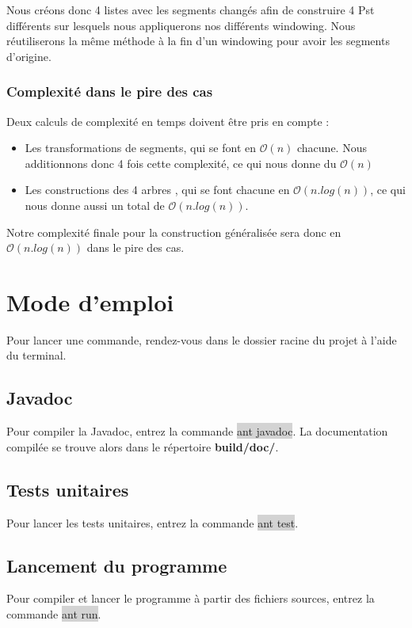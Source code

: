 \documentclass[10pt,a4paper]{article}
\begin{document}
Nous créons donc 4 listes avec les segments changés afin de construire 4 Pst différents sur lesquels nous appliquerons nos différents windowing. Nous réutiliserons la même méthode à la fin d'un windowing pour avoir les segments d'origine.

\subsubsection{Complexité dans le pire des cas}
Deux calculs de complexité en temps doivent être pris en compte :
\begin{itemize}
\item Les transformations de segments, qui se font en $\mathcal{O}(n)$ chacune. Nous additionnons donc 4 fois cette complexité, ce qui nous donne du $\mathcal{O}(n)$

\item Les constructions des 4 arbres , qui se font chacune en $\mathcal{O}(n.log(n))$, ce qui nous donne aussi un total de $\mathcal{O}(n.log(n))$.

\end{itemize}

Notre complexité finale pour la construction généralisée sera donc en $\mathcal{O}(n.log(n))$ dans le pire des cas.

\newpage
\section{Mode d'emploi}
Pour lancer une commande, rendez-vous dans le dossier racine du projet à l'aide du terminal.

\subsection{Javadoc}
Pour compiler la Javadoc, entrez la commande \colorbox{lightgray}{ant javadoc}. La documentation compilée se trouve alors dans le répertoire \textbf{build/doc/}.

\subsection{Tests unitaires}
Pour lancer les tests unitaires, entrez la commande \colorbox{lightgray}{ant test}.

\subsection{Lancement du programme}
Pour compiler et lancer le programme à partir des fichiers sources, entrez la commande \colorbox{lightgray}{ant run}.
\end{document}
